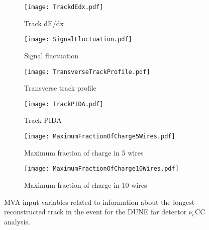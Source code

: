 \begin{figure}
  \centering
  \begin{subfigure}[t]{0.4\linewidth}
    \centering
    \texttt{[image: TrackdEdx.pdf]}
    \caption{Track dE/dx}
  \end{subfigure}
  \begin{subfigure}[t]{0.4\linewidth}
    \centering
    \texttt{[image: SignalFluctuation.pdf]}
    \caption{Signal fluctuation}
  \end{subfigure}
  \begin{subfigure}[t]{0.4\linewidth}
    \centering
    \texttt{[image: TransverseTrackProfile.pdf]}
    \caption{Transverse track profile}
  \end{subfigure}
  \begin{subfigure}[t]{0.4\linewidth}
    \centering
    \texttt{[image: TrackPIDA.pdf]}
    \caption{Track PIDA}
  \end{subfigure}
  \begin{subfigure}[t]{0.4\linewidth}
    \centering
    \texttt{[image: MaximumFractionOfCharge5Wires.pdf]}
    \caption{Maximum fraction of charge in 5 wires}
  \end{subfigure}
  \begin{subfigure}[t]{0.4\linewidth}
    \centering
    \texttt{[image: MaximumFractionOfCharge10Wires.pdf]}
    \caption{Maximum fraction of charge in 10 wires}
  \end{subfigure}
  \caption[MVA input variables related to information about the longest reconstructed track in the event for the DUNE far detector $\nu_e$CC analysis.]{MVA input variables related to information about the longest reconstructed track in the event for the DUNE far detector $\nu_e$CC analysis.}
  \label{fig:FDMVATrackVariables}
\end{figure}

